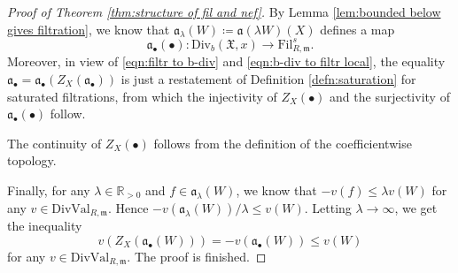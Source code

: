 \documentclass[10pt,a4paper]{amsart}
\newcommand{\Div}{\mathrm{Div}}
\newcommand{\DivVal}{\mathrm{DivVal}}
\newcommand{\Fil}{\mathrm{Fil}}
\newcommand{\bR}{\mathbb{R}}
\newcommand{\fX}{\mathfrak{X}}
\newcommand{\fa}{\mathfrak{a}}
\newcommand{\fm}{\mathfrak{m}}
\begin{document}
\begin{proof}[Proof of Theorem \ref{thm:structure of fil and nef}]
    By Lemma \ref{lem:bounded below gives filtration}, we know that $\fa_\lambda(W)\coloneqq\fa(\lambda W)(X)$ defines a map 
    \[
        \fa_\bullet(\bullet):\Div_b(\fX,x)\to \Fil^s_{R,\fm}.
    \]
    Moreover, in view of \eqref{eqn:filtr to b-div} and \eqref{eqn:b-div to filtr local}, the equality $\fa_\bullet=\fa_\bullet(Z_X(\fa_\bullet))$ is just a restatement of Definition \ref{defn:saturation} for saturated filtrations, from which the injectivity of $Z_X(\bullet)$ and the surjectivity of $\fa_\bullet(\bullet)$ follow.

    The continuity of $Z_X(\bullet)$ follows from the definition of the coefficientwise topology.

    Finally, for any $\lambda\in\bR_{>0}$ and $f\in\fa_\lambda(W)$, we know that $-v(f)\le \lambda v(W)$ for any $v\in\DivVal_{R,\fm}$. Hence $-v(\fa_\lambda(W))/\lambda\le v(W)$. 
    Letting $\lambda\to\infty$, we get the inequality 
    \[
        v(Z_X(\fa_\bullet(W)))=-v(\fa_\bullet(W))\le v(W)
    \]
    for any $v\in\DivVal_{R,\fm}$. The proof is finished.
\end{proof}
\end{document}
